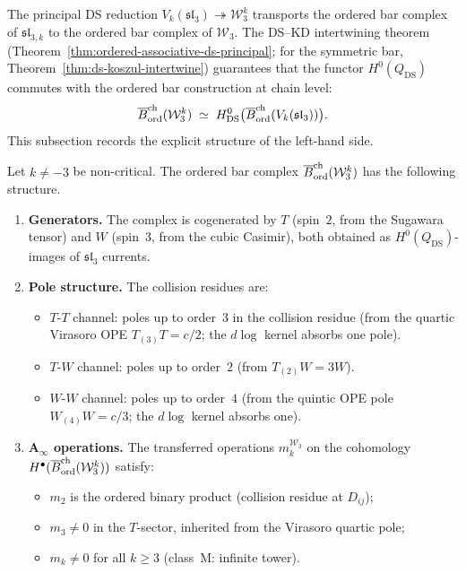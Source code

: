 The principal DS reduction $V_k(\mathfrak{sl}_3) \twoheadrightarrow
\mathcal{W}_3^k$ transports the ordered bar complex of
$\widehat{\mathfrak{sl}}_{3,k}$ to the ordered bar complex of
$\mathcal{W}_3$. The DS--KD intertwining theorem
(Theorem~\ref{thm:ordered-associative-ds-principal}; for the symmetric
bar, Theorem~\ref{thm:ds-koszul-intertwine}) guarantees that the
functor $H^0(Q_{\mathrm{DS}})$ commutes with the ordered bar
construction at chain level:
\begin{equation}\label{eq:w3-ordered-bar-ds}
\overline{B}^{\mathrm{ch}}_{\mathrm{ord}}(\mathcal{W}_3^k)
\;\simeq\;
H^0_{\mathrm{DS}}\bigl(\overline{B}^{\mathrm{ch}}_{\mathrm{ord}}(V_k(\mathfrak{sl}_3))\bigr).
\end{equation}
This subsection records the explicit structure of the left-hand side.

\begin{theorem}
\label{thm:w3-ordered-bar}
Let $k \neq -3$ be non-critical. The ordered bar complex
$\overline{B}^{\mathrm{ch}}_{\mathrm{ord}}(\mathcal{W}_3^k)$ has the following structure.

\begin{enumerate}[label=\textup{(\roman*)}]
\item \textbf{Generators.} The complex is cogenerated by
 $T$ \textup{(}spin~$2$, from the Sugawara tensor\textup{)} and
 $W$ \textup{(}spin~$3$, from the cubic Casimir\textup{)}, both
 obtained as $H^0(Q_{\mathrm{DS}})$-images of $\mathfrak{sl}_3$
 currents.

\item \textbf{Pole structure.} The collision residues are:
\begin{itemize}
\item $T$-$T$ channel: poles up to order~$3$ in the collision residue
 \textup{(}from the quartic Virasoro OPE $T_{(3)}T = c/2$; the
 $d\log$ kernel absorbs one pole\textup{)}.
\item $T$-$W$ channel: poles up to order~$2$
 \textup{(}from $T_{(2)}W = 3W$\textup{)}.
\item $W$-$W$ channel: poles up to order~$4$
 \textup{(}from the quintic OPE pole
 $W_{(4)}W = c/3$; the $d\log$ kernel absorbs one\textup{)}.
\end{itemize}

\item \textbf{A$_\infty$ operations.} The transferred operations
 $m_k^{\mathcal{W}_3}$ on the cohomology
 $H^\bullet(\overline{B}^{\mathrm{ch}}_{\mathrm{ord}}(\mathcal{W}_3^k))$ satisfy:
 \begin{itemize}
 \item $m_2$ is the ordered binary product
 \textup{(}collision residue at $D_{ij}$\textup{)};
 \item $m_3 \neq 0$ in the $T$-sector, inherited from the Virasoro
 quartic pole;
 \item $m_k \neq 0$ for all $k \geq 3$
 \textup{(}class~$\mathrm{M}$: infinite tower\textup{)}.
 \end{itemize}


\end{enumerate}
\end{theorem}
